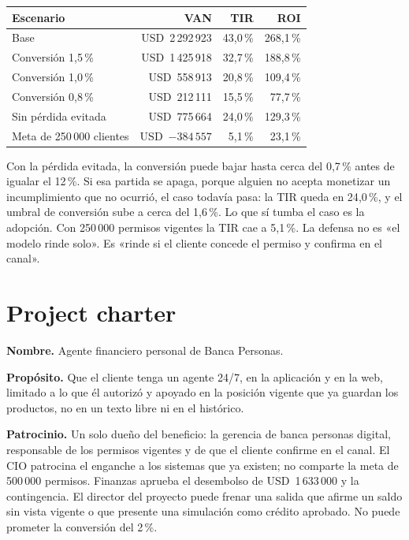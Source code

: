 \documentclass[11pt]{article}
\newcommand{\usd}[1]{USD~#1}
\begin{document}
\begin{table}[ht]
\centering
\small
\begin{tabular}{lrrr}
\toprule
\textbf{Escenario} & \textbf{VAN} & \textbf{TIR} & \textbf{ROI} \\
\midrule
Base & \usd{2\,292\,923} & 43{,}0\,\% & 268{,}1\,\% \\
Conversión 1{,}5\,\% & \usd{1\,425\,918} & 32{,}7\,\% & 188{,}8\,\% \\
Conversión 1{,}0\,\% & \usd{558\,913} & 20{,}8\,\% & 109{,}4\,\% \\
Conversión 0{,}8\,\% & \usd{212\,111} & 15{,}5\,\% & 77{,}7\,\% \\
Sin pérdida evitada & \usd{775\,664} & 24{,}0\,\% & 129{,}3\,\% \\
Meta de 250\,000 clientes & \usd{$-384\,557$} & 5{,}1\,\% & 23{,}1\,\% \\
\bottomrule
\end{tabular}
\end{table}

Con la pérdida evitada, la conversión puede bajar hasta cerca del 0{,}7\,\% antes de igualar el 12\,\%. Si esa partida se apaga, porque alguien no acepta monetizar un incumplimiento que no ocurrió, el caso todavía pasa: la TIR queda en 24{,}0\,\%, y el umbral de conversión sube a cerca del 1{,}6\,\%. Lo que sí tumba el caso es la adopción. Con 250\,000 permisos vigentes la TIR cae a 5{,}1\,\%. La defensa no es «el modelo rinde solo». Es «rinde si el cliente concede el permiso y confirma en el canal».

\section{Project charter}

\textbf{Nombre.} Agente financiero personal de Banca Personas.

\textbf{Propósito.} Que el cliente tenga un agente 24/7, en la aplicación y en la web, limitado a lo que él autorizó y apoyado en la posición vigente que ya guardan los productos, no en un texto libre ni en el histórico.

\textbf{Patrocinio.} Un solo dueño del beneficio: la gerencia de banca personas digital, responsable de los permisos vigentes y de que el cliente confirme en el canal. El CIO patrocina el enganche a los sistemas que ya existen; no comparte la meta de 500\,000 permisos. Finanzas aprueba el desembolso de \usd{1\,633\,000} y la contingencia. El director del proyecto puede frenar una salida que afirme un saldo sin vista vigente o que presente una simulación como crédito aprobado. No puede prometer la conversión del 2\,\%.
\end{document}
